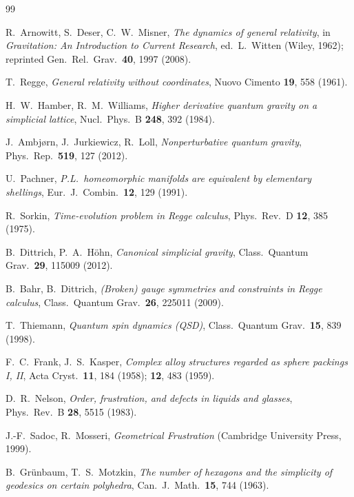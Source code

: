 \documentclass[11pt]{article}
\begin{document}
\begin{thebibliography}{99}

 R.~Arnowitt, S.~Deser, C.~W.~Misner,
\emph{The dynamics of general relativity}, in \emph{Gravitation: An
Introduction to Current Research}, ed.\ L.~Witten (Wiley, 1962);
reprinted Gen.\ Rel.\ Grav.\ \textbf{40}, 1997 (2008).

 T.~Regge,
\emph{General relativity without coordinates},
Nuovo Cimento \textbf{19}, 558 (1961).

 H.~W.~Hamber, R.~M.~Williams,
\emph{Higher derivative quantum gravity on a simplicial lattice},
Nucl.\ Phys.\ B \textbf{248}, 392 (1984).

 J.~Ambj{\o}rn, J.~Jurkiewicz, R.~Loll,
\emph{Nonperturbative quantum gravity},
Phys.\ Rep.\ \textbf{519}, 127 (2012).

 U.~Pachner,
\emph{P.L.\ homeomorphic manifolds are equivalent by elementary shellings},
Eur.\ J.\ Combin.\ \textbf{12}, 129 (1991).

 R.~Sorkin,
\emph{Time-evolution problem in Regge calculus},
Phys.\ Rev.\ D \textbf{12}, 385 (1975).

 B.~Dittrich, P.~A.~H\"ohn,
\emph{Canonical simplicial gravity},
Class.\ Quantum Grav.\ \textbf{29}, 115009 (2012).

 B.~Bahr, B.~Dittrich,
\emph{(Broken) gauge symmetries and constraints in Regge calculus},
Class.\ Quantum Grav.\ \textbf{26}, 225011 (2009).

 T.~Thiemann,
\emph{Quantum spin dynamics (QSD)},
Class.\ Quantum Grav.\ \textbf{15}, 839 (1998).

 F.~C.~Frank, J.~S.~Kasper,
\emph{Complex alloy structures regarded as sphere packings I, II},
Acta Cryst.\ \textbf{11}, 184 (1958); \textbf{12}, 483 (1959).

 D.~R.~Nelson,
\emph{Order, frustration, and defects in liquids and glasses},
Phys.\ Rev.\ B \textbf{28}, 5515 (1983).

 J.-F.~Sadoc, R.~Mosseri,
\emph{Geometrical Frustration} (Cambridge University Press, 1999).

 B.~Gr\"unbaum, T.~S.~Motzkin,
\emph{The number of hexagons and the simplicity of geodesics on certain
polyhedra}, Can.\ J.\ Math.\ \textbf{15}, 744 (1963).


\end{thebibliography}
\end{document}

